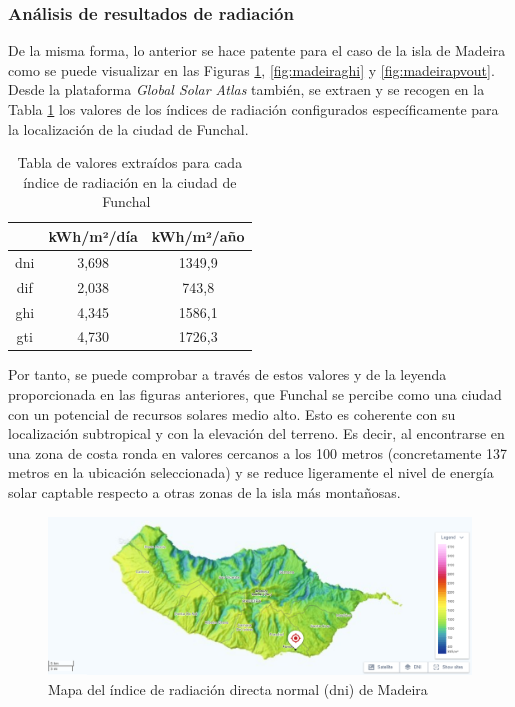 \subsubsection{Análisis de resultados de radiación}

De la misma forma, lo anterior se hace patente para el caso de la isla de Madeira como se puede visualizar en las Figuras \ref{fig:madeiradni}, \ref{fig:madeiraghi} y \ref{fig:madeirapvout}. Desde la plataforma \textit{Global Solar Atlas} también, se extraen y se recogen en la Tabla \ref{tab:global} los valores de los índices de radiación configurados específicamente para la localización de la ciudad de Funchal. 

\vspace{5mm}

\begin{table}[h!]
    \centering
    \begin{tabular}{|c|c|c|}
    \hline
    \rowcolor[HTML]{AAAAAA} 
    \multicolumn{1}{|c|}{\cellcolor[HTML]{AAAAAA}Parámetro} & \multicolumn{1}{c|}{\cellcolor[HTML]{AAAAAA}kWh/m²/día} & kWh/m²/año \\ \hline
    \gls{dni} & 3,698 & 1349,9 \\ \hline
    \gls{dif} & 2,038 & 743,8 \\ \hline
    \gls{ghi} & 4,345 & 1586,1 \\ \hline
    \gls{gti} & 4,730 & 1726,3 \\ \hline
    \end{tabular}
    \caption{Tabla de valores extraídos para cada índice de radiación en la ciudad de Funchal~\cite{globalsolar}}
    \label{tab:global}
\end{table}

\vspace{3mm}

Por tanto, se puede comprobar a través de estos valores y de la leyenda proporcionada en las figuras anteriores, que Funchal se percibe como una ciudad con un potencial de recursos solares medio alto. Esto es coherente con su localización subtropical y con la elevación del terreno. Es decir, al encontrarse en una zona de costa ronda en valores cercanos a los 100 metros (concretamente 137 metros en la ubicación seleccionada) y se reduce ligeramente el nivel de energía solar captable respecto a otras zonas de la isla más montañosas.

\pagebreak

\begin{figure}[H]
    \centering
    \includegraphics[width=1\textwidth]{img/diseno/madeiradni.png}
    \caption{Mapa del índice de radiación directa normal (\acrshort{dni}) de Madeira \cite{globalsolar}}
    \label{fig:madeiradni}
\end{figure}

